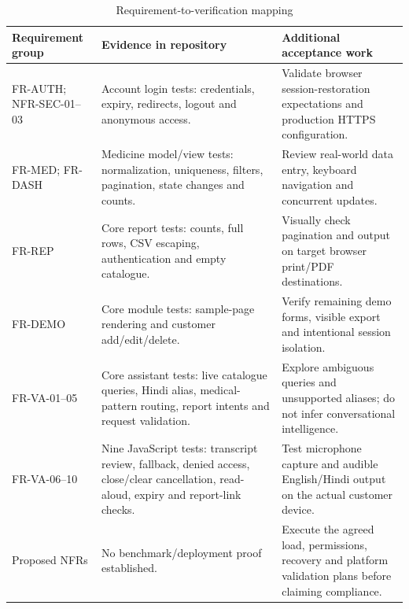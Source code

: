\documentclass[11pt,a4paper]{article}
\begin{document}
\begin{table}[H]
\centering\small
\caption{Requirement-to-verification mapping}
\begin{tabularx}{\textwidth}{L{39mm}L{49mm}Y}
\toprule Requirement group & Evidence in repository & Additional acceptance work\\\midrule
FR-AUTH; NFR-SEC-01--03 & Account login tests: credentials, expiry, redirects, logout and anonymous access. & Validate browser session-restoration expectations and production HTTPS configuration.\\
FR-MED; FR-DASH & Medicine model/view tests: normalization, uniqueness, filters, pagination, state changes and counts. & Review real-world data entry, keyboard navigation and concurrent updates.\\
FR-REP & Core report tests: counts, full rows, CSV escaping, authentication and empty catalogue. & Visually check pagination and output on target browser print/PDF destinations.\\
FR-DEMO & Core module tests: sample-page rendering and customer add/edit/delete. & Verify remaining demo forms, visible export and intentional session isolation.\\
FR-VA-01--05 & Core assistant tests: live catalogue queries, Hindi alias, medical-pattern routing, report intents and request validation. & Explore ambiguous queries and unsupported aliases; do not infer conversational intelligence.\\
FR-VA-06--10 & Nine JavaScript tests: transcript review, fallback, denied access, close/clear cancellation, read-aloud, expiry and report-link checks. & Test microphone capture and audible English/Hindi output on the actual customer device.\\
Proposed NFRs & No benchmark/deployment proof established. & Execute the agreed load, permissions, recovery and platform validation plans before claiming compliance.\\
\bottomrule
\end{tabularx}
\end{table}
\end{document}
